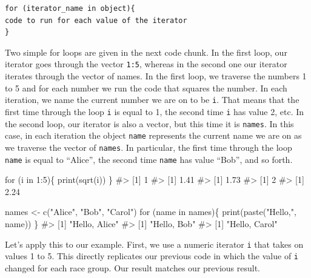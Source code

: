 \documentclass[
  letterpaper,
]{latex/krantz}
\makeatletter
\newenvironment{Shaded}{\begin{snugshade}}{\end{snugshade}}
\newcommand{\CommentTok}[1]{\textcolor[rgb]{0.37,0.37,0.37}{#1}}
\newcommand{\ControlFlowTok}[1]{\textcolor[rgb]{0.00,0.23,0.31}{#1}}
\newcommand{\DecValTok}[1]{\textcolor[rgb]{0.68,0.00,0.00}{#1}}
\newcommand{\FunctionTok}[1]{\textcolor[rgb]{0.28,0.35,0.67}{#1}}
\newcommand{\NormalTok}[1]{\textcolor[rgb]{0.00,0.23,0.31}{#1}}
\newcommand{\OtherTok}[1]{\textcolor[rgb]{0.00,0.23,0.31}{#1}}
\newcommand{\SpecialCharTok}[1]{\textcolor[rgb]{0.37,0.37,0.37}{#1}}
\newcommand{\StringTok}[1]{\textcolor[rgb]{0.13,0.47,0.30}{#1}}
\newenvironment{kframe}{%
\medskip{}
\setlength{\fboxsep}{.8em}
 \def\at@end@of@kframe{}%
 \ifinner\ifhmode%
  \def\at@end@of@kframe{\end{minipage}}%
  \begin{minipage}{\columnwidth}%
 \fi\fi%
 \def\FrameCommand##1{\hskip\@totalleftmargin \hskip-\fboxsep
 \colorbox{shadecolor}{##1}\hskip-\fboxsep
     \hskip-\linewidth \hskip-\@totalleftmargin \hskip\columnwidth}%
 \MakeFramed {\advance\hsize-\width
   \@totalleftmargin\z@ \linewidth\hsize
   \@setminipage}}%
 {\par\unskip\endMakeFramed%
 \at@end@of@kframe}
\renewenvironment{Shaded}{\begin{kframe}}{\end{kframe}}
\makeatother
\begin{document}
\begin{verbatim}
for (iterator_name in object){
code to run for each value of the iterator
}
\end{verbatim}

Two simple for loops are given in the next code chunk. In the first
loop, our iterator goes through the vector \texttt{1:5}, whereas in the
second one our iterator iterates through the vector of names. In the
first loop, we traverse the numbers 1 to 5 and for each number we run
the code that squares the number. In each iteration, we name the current
number we are on to be \texttt{i}. That means that the first time
through the loop \texttt{i} is equal to 1, the second time \texttt{i}
has value 2, etc. In the second loop, our iterator is also a vector, but
this time it is \texttt{names}. In this case, in each iteration the
object \texttt{name} represents the current name we are on as we
traverse the vector of \texttt{names}. In particular, the first time
through the loop \texttt{name} is equal to ``Alice'', the second time
\texttt{name} has value ``Bob'', and so forth.

\begin{Shaded}
\begin{Highlighting}[]
\ControlFlowTok{for}\NormalTok{ (i }\ControlFlowTok{in} \DecValTok{1}\SpecialCharTok{:}\DecValTok{5}\NormalTok{)\{}
  \FunctionTok{print}\NormalTok{(}\FunctionTok{sqrt}\NormalTok{(i))}
\NormalTok{\}}
\CommentTok{\#\textgreater{} [1] 1}
\CommentTok{\#\textgreater{} [1] 1.41}
\CommentTok{\#\textgreater{} [1] 1.73}
\CommentTok{\#\textgreater{} [1] 2}
\CommentTok{\#\textgreater{} [1] 2.24}
\end{Highlighting}
\end{Shaded}

\begin{Shaded}
\begin{Highlighting}[]
\NormalTok{names }\OtherTok{\textless{}{-}} \FunctionTok{c}\NormalTok{(}\StringTok{"Alice"}\NormalTok{, }\StringTok{"Bob"}\NormalTok{, }\StringTok{"Carol"}\NormalTok{)}
\ControlFlowTok{for}\NormalTok{ (name }\ControlFlowTok{in}\NormalTok{ names)\{}
  \FunctionTok{print}\NormalTok{(}\FunctionTok{paste}\NormalTok{(}\StringTok{"Hello,"}\NormalTok{, name))}
\NormalTok{\}}
\CommentTok{\#\textgreater{} [1] "Hello, Alice"}
\CommentTok{\#\textgreater{} [1] "Hello, Bob"}
\CommentTok{\#\textgreater{} [1] "Hello, Carol"}
\end{Highlighting}
\end{Shaded}

Let's apply this to our example. First, we use a numeric iterator
\texttt{i} that takes on values 1 to 5. This directly replicates our
previous code in which the value of \texttt{i} changed for each race
group. Our result matches our previous result.
\end{document}
